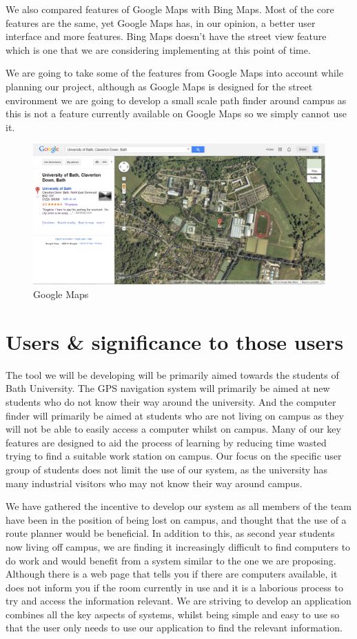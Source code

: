 \documentclass[10pt,a4paper,oneside]{report}
\begin{document}
We also compared features of Google Maps with Bing Maps. Most of the core features are the same, yet Google Maps has, in our opinion, a better user interface and more features. Bing Maps doesn't have the street view feature which is one that we are considering implementing at this point of time.

We are going to take some of the features from Google Maps into account while planning our project, although as Google Maps is designed for the street environment we are going to develop a small scale path finder around campus as this is not a feature currently available on Google Maps so we simply cannot use it.

\begin{figure}[H]
 \centering
 \includegraphics[keepaspectratio, width=\textwidth]{googlemapsexample.png}
 \caption{Google Maps}
\end{figure}

\section*{Users \& significance to those users}
The tool we will be developing will be primarily aimed towards the students of Bath University.  The GPS navigation system will primarily be aimed at new students who do not know their way around the university. And the computer finder will primarily be aimed at students who are not living on campus as they will not be able to easily access a computer whilst on campus. Many of our key features are designed to aid the process of learning by reducing time wasted trying to find a suitable work station on campus. Our focus on the specific user group of students does not limit the use of our system, as the university has many industrial visitors who may not know their way around campus.

We have gathered the incentive to develop our system as all members of the team have been in the position of being lost on campus, and thought that the use of a route planner would be beneficial. In addition to this, as second year students now living off campus, we are finding it increasingly difficult to find computers to do work and would benefit from a system similar to the one we are proposing.  Although there is a web page that tells you if there are computers available, it does not inform you if the room currently in use and it is a laborious process to try and access the information relevant. We are striving to develop an application combines all the key aspects of systems, whilst being simple and easy to use so that the user only needs to use our application to find the relevant information.
\end{document}
